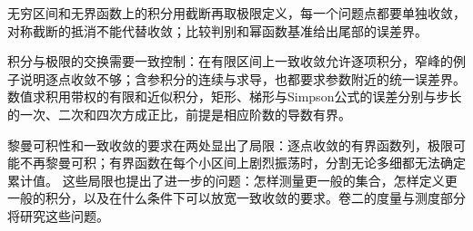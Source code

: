 无穷区间和无界函数上的积分用截断再取极限定义，每一个问题点都要单独收敛，对称截断的抵消不能代替收敛；比较判别和幂函数基准给出尾部的误差界。

积分与极限的交换需要一致控制：在有限区间上一致收敛允许逐项积分，窄峰的例子说明逐点收敛不够；含参积分的连续与求导，也都要求参数附近的统一误差界。
数值求积用带权的有限和近似积分，矩形、梯形与Simpson公式的误差分别与步长的一次、二次和四次方成正比，前提是相应阶数的导数有界。

黎曼可积性和一致收敛的要求在两处显出了局限：逐点收敛的有界函数列，极限可能不再黎曼可积；有界函数在每个小区间上剧烈振荡时，分割无论多细都无法确定累计值。
这些局限也提出了进一步的问题：怎样测量更一般的集合，怎样定义更一般的积分，以及在什么条件下可以放宽一致收敛的要求。卷二的度量与测度部分将研究这些问题。
